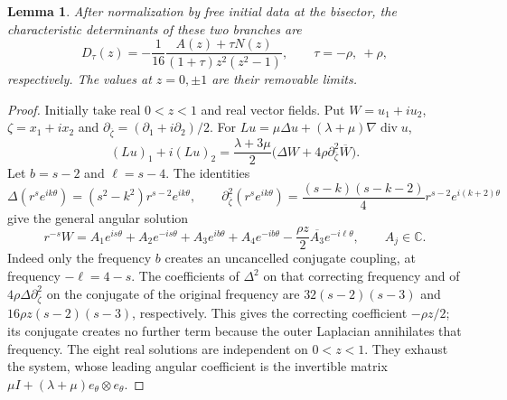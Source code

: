 \documentclass[11pt,a4paper]{article}
\newtheorem{lemma}[theorem]{Lemma}
\theoremstyle{remark}
\numberwithin{equation}{section}
\begin{document}
\begin{lemma}\label{lem:planar-det20}
After normalization by free initial data at the bisector, the characteristic
determinants of these two branches are
\begin{equation}\label{eq:planar-det20}
 D_\tau(z)=-\frac1{16}
 \frac{A(z)+\tau N(z)}{(1+\tau)z^2(z^2-1)},
 \qquad \tau=-\rho,\ +\rho,
\end{equation}
respectively. The values at $z=0,\pm1$ are their removable limits.
\end{lemma}

\begin{proof}
Initially take real $0<z<1$ and real vector fields. Put
$W=u_1+iu_2$, $\zeta=x_1+ix_2$ and
$\partial_{\overline\zeta}=(\partial_1+i\partial_2)/2$.
For $Lu=\mu\Delta u+(\lambda+\mu)\nabla\operatorname{div}u$,
\[
 (Lu)_1+i(Lu)_2
 =\frac{\lambda+3\mu}{2}
 \bigl(\Delta W+4\rho\partial_{\overline\zeta}^2\overline W\bigr).
\]
Let $b=s-2$ and $\ell=s-4$. The identities
\[
 \Delta(r^se^{ik\theta})=(s^2-k^2)r^{s-2}e^{ik\theta},
 \qquad
 \partial_{\overline\zeta}^2(r^se^{ik\theta})
 =\frac{(s-k)(s-k-2)}4r^{s-2}e^{i(k+2)\theta}
\]
give the general angular solution
\begin{equation}\label{eq:planar-W20}
 r^{-s}W=A_1e^{is\theta}+A_2e^{-is\theta}
   +A_3e^{ib\theta}+A_4e^{-ib\theta}
   -\frac{\rho z}{2}\overline{A_3}e^{-i\ell\theta},
 \qquad A_j\in\mathbb C.
\end{equation}
Indeed only the frequency $b$ creates an uncancelled conjugate coupling,
at frequency $-\ell=4-s$. The coefficients of $\Delta^2$ on that correcting
frequency and of $4\rho\Delta\partial_{\overline\zeta}^2$ on the conjugate
of the original frequency are $32(s-2)(s-3)$ and
$16\rho z(s-2)(s-3)$, respectively. This gives the correcting coefficient
$-\rho z/2$; its conjugate creates no further term because the outer
Laplacian annihilates that frequency. The eight real solutions are
independent on $0<z<1$. They exhaust the system, whose leading angular
coefficient is the invertible matrix
$\mu I+(\lambda+\mu)e_\theta\otimes e_\theta$.


\end{proof}
\end{document}
